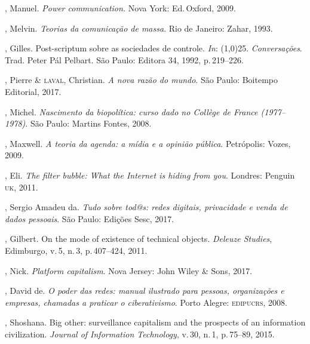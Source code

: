 
\begin{bibliohedra}
, Manuel. \textit{Power communication.} Nova York: Ed.\,Oxford,
2009.

, Melvin. \textit{Teorias da comunicação de massa}. Rio de Janeiro: Zahar, 1993.

, Gilles. Post-scriptum sobre as sociedades de controle. \textit{In}:
\line(1,0){25}. \textit{Conversações}. Trad. Peter Pál Pelbart. São Paulo:
Editora 34, 1992, p.\,219--226.

, Pierre \& \textsc{laval}, Christian. \textit{A nova razão do mundo}.
São Paulo: Boitempo Editorial, 2017.

, Michel. \textit{Nascimento da biopolítica: curso dado no
Collège de France (1977--1978)}. São Paulo: Martins Fontes, 2008.

, Maxwell. \textit{A teoria da agenda: a mídia e a opinião
pública}. Petrópolis: Vozes, 2009.

, Eli. \textit{The filter bubble: What the Internet is hiding
from you}. Londres: Penguin \textsc{uk}, 2011.

, Sergio Amadeu da. \textit{Tudo sobre tod@s: redes digitais,
privacidade e venda de dados pessoais}. São Paulo: Edições Sesc, 2017.

, Gilbert. On the mode of existence of technical
objects. \textit{Deleuze Studies}, Edimburgo, v.\,5, n.\,3, p.\,407--424, 2011.

, Nick. \textit{Platform capitalism}. Nova Jersey: John Wiley \& Sons, 2017.

, David de. \textit{O poder das redes: manual ilustrado para
pessoas, organizações e empresas, chamadas a praticar o ciberativismo}.
Porto Alegre: \textsc{edipucrs}, 2008.

, Shoshana. Big other: surveillance capitalism and the
prospects of an information civilization. \textit{Journal of Information
Technology}, v.\,30, n.\,1, p.\,75--89, 2015.


\end{bibliohedra}

